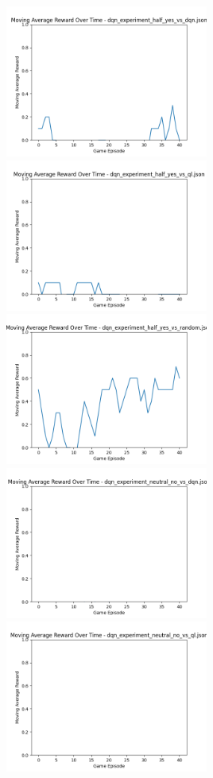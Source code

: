 \includegraphics[width=0.5\textwidth]{images/moving_average_reward_dqn_experiment_half_yes_vs_dqn.png} 
\includegraphics[width=0.5\textwidth]{images/moving_average_reward_dqn_experiment_half_yes_vs_ql.png} 
\includegraphics[width=0.5\textwidth]{images/moving_average_reward_dqn_experiment_half_yes_vs_random.png} 
\includegraphics[width=0.5\textwidth]{images/moving_average_reward_dqn_experiment_neutral_no_vs_dqn.png} 
\includegraphics[width=0.5\textwidth]{images/moving_average_reward_dqn_experiment_neutral_no_vs_ql.png} 
